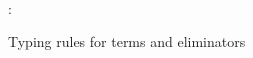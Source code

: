 \begin{figure}[H]
\\[2mm]
\flushleft {}
\begin{smathpar}
   {
      \Gamma \vdash {}: \Delta
   }
\end{smathpar}
\caption{Typing rules for terms and eliminators}
\label{fig:core-typing-term}
\end{figure}
